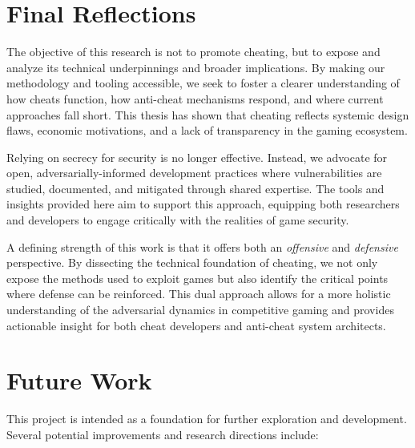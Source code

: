 \section*{Final Reflections}

The objective of this research is not to promote cheating, but to expose and analyze its technical underpinnings and broader implications. By making our methodology and tooling accessible, we seek to foster a clearer understanding of how cheats function, how anti-cheat mechanisms respond, and where current approaches fall short. This thesis has shown that cheating reflects systemic design flaws, economic motivations, and a lack of transparency in the gaming ecosystem.

Relying on secrecy for security is no longer effective. Instead, we advocate for open, adversarially-informed development practices where vulnerabilities are studied, documented, and mitigated through shared expertise. The tools and insights provided here aim to support this approach, equipping both researchers and developers to engage critically with the realities of game security.

\begin{tcolorbox}[colback=gray!10, colframe=white, boxrule=0pt, sharp corners]
A defining strength of this work is that it offers both an \emph{offensive} and \emph{defensive} perspective. By dissecting the technical foundation of cheating, we not only expose the methods used to exploit games but also identify the critical points where defense can be reinforced. This dual approach allows for a more holistic understanding of the adversarial dynamics in competitive gaming and provides actionable insight for both cheat developers and anti-cheat system architects.
\end{tcolorbox}

\section*{Future Work}

This project is intended as a foundation for further exploration and development. Several potential improvements and research directions include:


